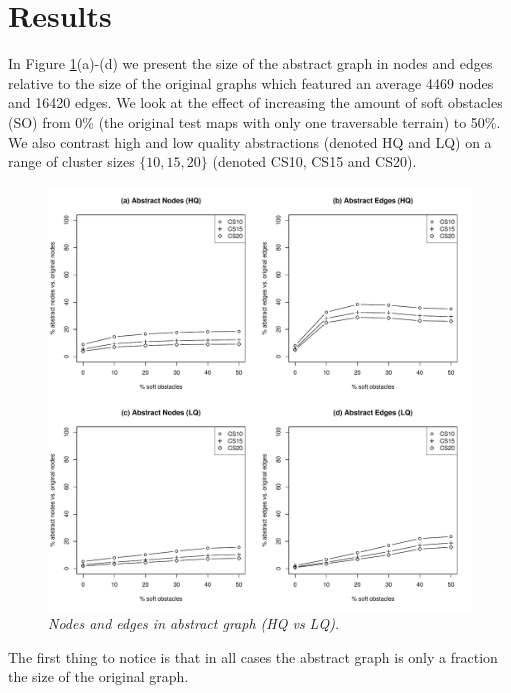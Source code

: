 \section{Results}
In Figure \ref{aha-fig:graphsize}(a)-(d) we present the size of the abstract graph in nodes and edges relative to the size of the original graphs which featured an average 4469 nodes and 16420 edges. 
We look at the effect of increasing the amount of soft obstacles (SO) from 0\% (the original test maps with only one traversable terrain) to 50\%.
We also contrast high and low quality abstractions (denoted HQ and LQ) on a range of cluster sizes $\lbrace 10, 15, 20 \rbrace$ (denoted CS10, CS15 and CS20).
\begin{figure}[htbp]
	\vspace{-12pt}
       \caption{\small{\emph{Nodes and edges in abstract graph (HQ vs LQ). }}}
       \begin{center}
                       \includegraphics[scale=0.35, trim = 20mm 14mm 20mm 5mm]{diagrams/graphsize.pdf}
       \end{center}
       \label{aha-fig:graphsize}
	\vspace{-5pt}
\end{figure}
\par \indent
The first thing to notice is that in all cases the abstract graph is only a fraction the size of the original graph.
